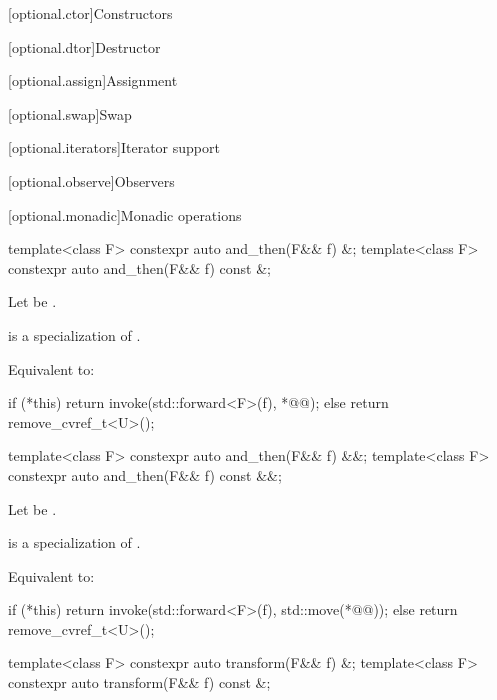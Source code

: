 [optional.ctor]{Constructors}


[optional.dtor]{Destructor}

[optional.assign]{Assignment}


[optional.swap]{Swap}

[optional.iterators]{Iterator support}

[optional.observe]{Observers}

[optional.monadic]{Monadic operations}

\begin{itemdecl}
template<class F> constexpr auto and_then(F&& f) &;
template<class F> constexpr auto and_then(F&& f) const &;
\end{itemdecl}

\begin{itemdescr}
\pnum
Let  be .

\pnum
\mandates
{} is a specialization of .

\pnum
\effects
Equivalent to:
\begin{codeblock}
if (*this) {
  return invoke(std::forward<F>(f), *@@);
} else {
  return remove_cvref_t<U>();
}
\end{codeblock}
\end{itemdescr}

\begin{itemdecl}
template<class F> constexpr auto and_then(F&& f) &&;
template<class F> constexpr auto and_then(F&& f) const &&;
\end{itemdecl}

\begin{itemdescr}
\pnum
Let  be .

\pnum
\mandates
{} is a specialization of .

\pnum
\effects
Equivalent to:
\begin{codeblock}
if (*this) {
  return invoke(std::forward<F>(f), std::move(*@@));
} else {
  return remove_cvref_t<U>();
}
\end{codeblock}
\end{itemdescr}

\begin{itemdecl}
template<class F> constexpr auto transform(F&& f) &;
template<class F> constexpr auto transform(F&& f) const &;
\end{itemdecl}

